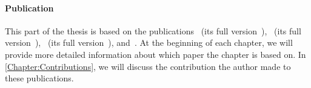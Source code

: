 \documentclass[../../diss.tex]{subfiles}
\begin{document}
\paragraph{Publication}

This part of the thesis is based on the publications~\cite{HolikMM16} (\resp its full version~\cite{HolikMM16a}),~\cite{HagueMM17} (\resp its full version~\cite{HagueMM17a}),~\cite{MeyerMZ18} (\resp its full version~\cite{MeyerMZ18a}), and~\cite{MeyerMN17a}.
At the beginning of each chapter, we will provide more detailed information about which paper the chapter is based on.
In \cref{Chapter:Contributions}, we will discuss the contribution the author made to these publications.
\end{document}
